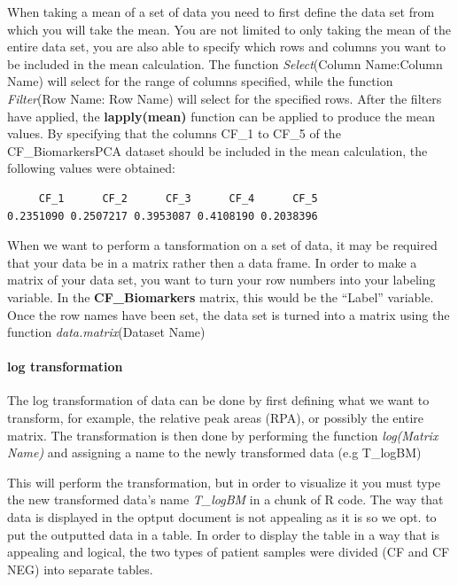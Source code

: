 \documentclass[]{elsarticle} %
\begin{document}
When taking a mean of a set of data you need to first define the data
set from which you will take the mean. You are not limited to only
taking the mean of the entire data set, you are also able to specify
which rows and columns you want to be included in the mean calculation.
The function \emph{Select}(Column Name:Column Name) will select for the
range of columns specified, while the function \emph{Filter}(Row Name:
Row Name) will select for the specified rows. After the filters have
applied, the \textbf{lapply(mean)} function can be applied to produce
the mean values. By specifying that the columns CF\_1 to CF\_5 of the
CF\_BiomarkersPCA dataset should be included in the mean calculation,
the following values were obtained:

\begin{verbatim}
     CF_1      CF_2      CF_3      CF_4      CF_5 
0.2351090 0.2507217 0.3953087 0.4108190 0.2038396 
\end{verbatim}

When we want to perform a tansformation on a set of data, it may be
required that your data be in a matrix rather then a data frame. In
order to make a matrix of your data set, you want to turn your row
numbers into your labeling variable. In the \textbf{CF\_Biomarkers}
matrix, this would be the ``Label'' variable. Once the row names have
been set, the data set is turned into a matrix using the function
\emph{data.matrix}(Dataset Name)

\hypertarget{log-transformation}{%
\paragraph{log transformation}\label{log-transformation}}

The log transformation of data can be done by first defining what we
want to transform, for example, the relative peak areas (RPA), or
possibly the entire matrix. The transformation is then done by
performing the function \emph{log(Matrix Name)} and assigning a name to
the newly transformed data (e.g T\_logBM)

This will perform the transformation, but in order to visualize it you
must type the new transformed data's name \emph{T\_logBM} in a chunk of
R code. The way that data is displayed in the optput document is not
appealing as it is so we opt. to put the outputted data in a table. In
order to display the table in a way that is appealing and logical, the
two types of patient samples were divided (CF and CF NEG) into separate
tables.
\end{document}
